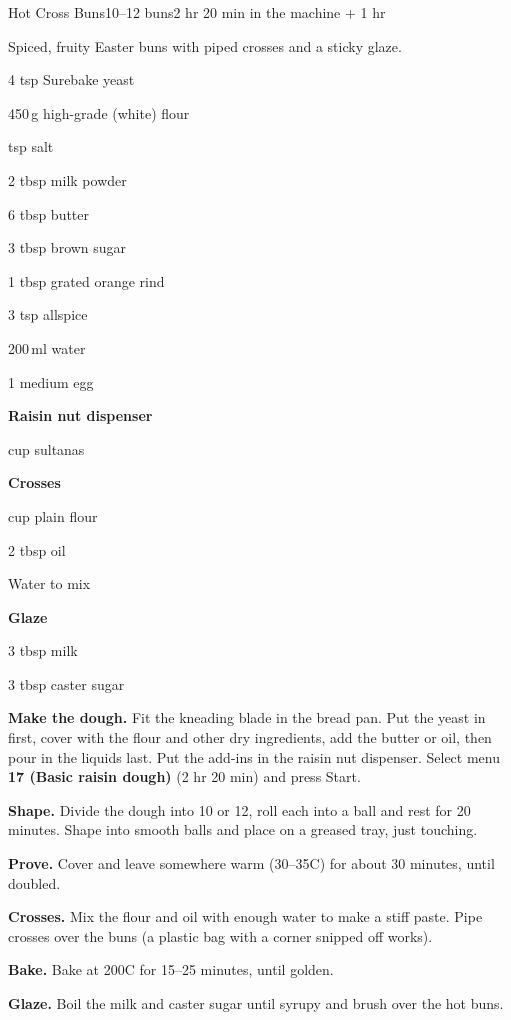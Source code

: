 \begin{recipebox}{Hot Cross Buns}{10--12 buns}{2 hr 20 min in the machine + 1 hr}

Spiced, fruity Easter buns with piped crosses and a sticky glaze.

\begin{ingredients}
  \item 4 tsp Surebake yeast
  \item 450\,g high-grade (white) flour
  \item {} tsp salt
  \item 2 tbsp milk powder
  \item 6 tbsp butter
  \item 3 tbsp brown sugar
  \item 1 tbsp grated orange rind
  \item 3 tsp allspice
  \item 200\,ml water
  \item 1 medium egg
  \item[] \textbf{Raisin nut dispenser}
  \item {} cup sultanas
  \item[] \textbf{Crosses}
  \item {} cup plain flour
  \item 2 tbsp oil
  \item Water to mix
  \item[] \textbf{Glaze}
  \item 3 tbsp milk
  \item 3 tbsp caster sugar
\end{ingredients}

\begin{method}
  \item \textbf{Make the dough.} Fit the kneading blade in the bread pan. Put the yeast in first, cover with the flour and other dry ingredients, add the butter or oil, then pour in the liquids last. Put the add-ins in the raisin nut dispenser. Select menu \textbf{17 (Basic raisin dough)} (2 hr 20 min) and press Start.
  \item \textbf{Shape.} Divide the dough into 10 or 12, roll each into a ball and rest for 20 minutes. Shape into smooth balls and place on a greased tray, just touching.
  \item \textbf{Prove.} Cover and leave somewhere warm (30--35\degree C) for about 30 minutes, until doubled.
  \item \textbf{Crosses.} Mix the flour and oil with enough water to make a stiff paste. Pipe crosses over the buns (a plastic bag with a corner snipped off works).
  \item \textbf{Bake.} Bake at 200\degree C for 15--25 minutes, until golden.
  \item \textbf{Glaze.} Boil the milk and caster sugar until syrupy and brush over the hot buns.
\end{method}


\end{recipebox}
